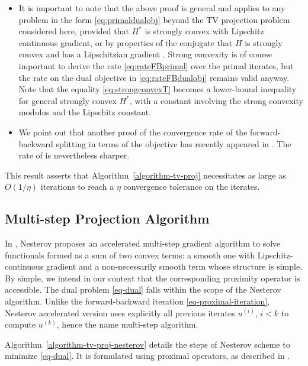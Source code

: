 \documentclass[11pt,nofonttune,a4paper]{IEEEtran}
\newcommand{\uk}{u^{(k)}}
\begin{document}
\begin{rem}
\begin{itemize}
\item It is important to note that the above proof is general and applies to any problem in the form \eqref{eq:primaldualobj} beyond the TV projection problem considered here, provided that $H^*$ is strongly convex with Lipschitz continuous gradient, or by properties of the conjugate that $H$ is strongly convex and has a Lipschitzian gradient \cite[Theorem~4.2.1 and 4.2.2]{LemarechalHiriart96}. Strong convexity is of course important to derive the rate \eqref{eq:rateFBprimal} over the primal iterates, but the rate on the dual objective in \eqref{eq:rateFBdualobj} remains valid anyway. Note that the equality \eqref{eq:strongconvexT} becomes a lower-bound inequality for general strongly convex $H^*$, with a constant involving the strong convexity modulus and the Lipschitz constant. 
\item We point out that another proof of the convergence rate of the forward-backward splitting in terms of the objective has recently appeared in \cite[Proposition~2]{BrediesLorentz08}. The rate of \cite{nesterov-gradient} is nevertheless sharper.
\end{itemize}
\end{rem}

This result asserts that Algorithm~\ref{algorithm-tv-proj} necessitates as large as $O(1/\eta)$ iterations to reach a $\eta$ convergence tolerance on the iterates.

\subsection{Multi-step Projection Algorithm}
\label{subsec-nesterov}
In \cite{nesterov-gradient,nesterov-smooth}, Nesterov proposes an accelerated multi-step gradient algorithm to solve functionals formed as a sum of two convex terms: a smooth one with Lipschitz-continuous gradient and a non-necessarily smooth term whose structure is simple. By simple, we intend in our context that the corresponding proximity operator is accessible. The dual problem \eqref{eq-dual} falls within the scope of the Nesterov algorithm. Unlike the forward-backward iteration \eqref{eq-proximal-iteration}, Nesterov accelerated version uses explicitly all previous iterates $u^{(i)}$, $i < k$ to compute $\uk$, hence the name multi-step algorithm.

Algorithm~\ref{algorithm-tv-proj-nesterov} details the steps of Nesterov scheme to minimize \eqref{eq-dual}. It is formulated using proximal operators, as described in \cite{weiss-tv-nesterov}. 
\end{document}

